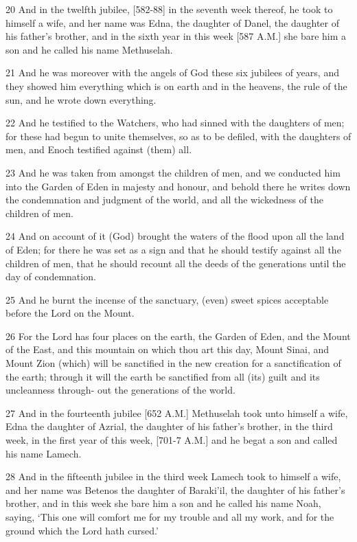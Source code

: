 \par 20 And in the twelfth jubilee, [582-88] in the seventh week thereof, he took to himself a wife, and her name was Edna, the daughter of Danel, the daughter of his father's brother, and in the sixth year in this week [587 A.M.] she bare him a son and he called his name Methuselah.
\par 21 And he was moreover with the angels of God these six jubilees of years, and they showed him everything which is on earth and in the heavens, the rule of the sun, and he wrote down everything.
\par 22 And he testified to the Watchers, who had sinned with the daughters of men; for these had begun to unite themselves, so as to be defiled, with the daughters of men, and Enoch testified against (them) all.
\par 23 And he was taken from amongst the children of men, and we conducted him into the Garden of Eden in majesty and honour, and behold there he writes down the condemnation and judgment of the world, and all the wickedness of the children of men.
\par 24 And on account of it (God) brought the waters of the flood upon all the land of Eden; for there he was set as a sign and that he should testify against all the children of men, that he should recount all the deeds of the generations until the day of condemnation.
\par 25 And he burnt the incense of the sanctuary, (even) sweet spices acceptable before the Lord on the Mount.
\par 26 For the Lord has four places on the earth, the Garden of Eden, and the Mount of the East, and this mountain on which thou art this day, Mount Sinai, and Mount Zion (which) will be sanctified in the new creation for a sanctification of the earth; through it will the earth be sanctified from all (its) guilt and its uncleanness through- out the generations of the world.
\par 27 And in the fourteenth jubilee [652 A.M.] Methuselah took unto himself a wife, Edna the daughter of Azrial, the daughter of his father's brother, in the third week, in the first year of this week, [701-7 A.M.] and he begat a son and called his name Lamech.
\par 28 And in the fifteenth jubilee in the third week Lamech took to himself a wife, and her name was Betenos the daughter of Baraki'il, the daughter of his father's brother, and in this week she bare him a son and he called his name Noah, saying, ‘This one will comfort me for my trouble and all my work, and for the ground which the Lord hath cursed.’
